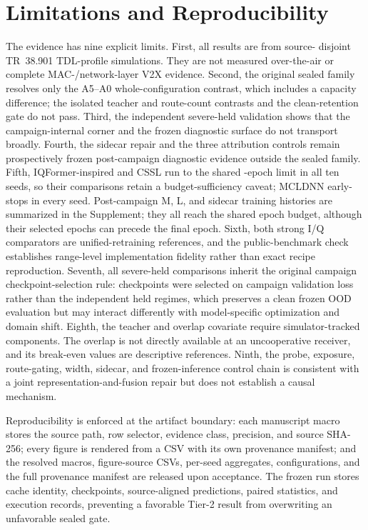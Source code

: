 \documentclass[letterpaper,journal]{IEEEtran}
\begin{document}
\section{Limitations and Reproducibility}
The evidence has nine explicit limits. First, all results are from source-
disjoint TR~38.901 TDL-profile simulations. They are not measured over-the-air
or complete MAC-/network-layer V2X evidence. Second, the original sealed family
resolves only the A5--A0 whole-configuration contrast, which includes a
capacity difference; the isolated teacher and route-count contrasts and the
clean-retention gate do not pass. Third, the
independent severe-held validation shows that the campaign-internal corner and
the frozen diagnostic surface do not transport broadly. Fourth, the sidecar
repair and the three attribution controls remain prospectively frozen post-campaign
diagnostic evidence outside the sealed family. Fifth, IQFormer-inspired and
CSSL run to the shared \TrainEpochs-epoch limit in all ten seeds, so their
comparisons retain a budget-sufficiency caveat; MCLDNN early-stops in every
seed. Post-campaign M, L, and sidecar training histories are summarized in the
Supplement; they all reach the shared epoch budget, although their selected
epochs can precede the final epoch. Sixth, both strong
I/Q comparators are unified-retraining references, and the public-benchmark
check establishes range-level implementation fidelity rather than exact recipe
reproduction. Seventh, all severe-held comparisons inherit the original
campaign checkpoint-selection rule: checkpoints were selected on campaign
validation loss rather than the independent held regimes, which preserves a
clean frozen OOD evaluation but may interact differently with model-specific
optimization and domain shift. Eighth, the teacher and overlap covariate
require simulator-tracked components. The overlap is not directly available at
an uncooperative receiver, and its break-even values are descriptive
references. Ninth, the probe, exposure, route-gating, width, sidecar, and
frozen-inference control chain is consistent with a joint
representation-and-fusion repair but does not establish a causal mechanism.

Reproducibility is enforced at the artifact boundary: each manuscript macro
stores the source path, row selector, evidence class, precision, and source
SHA-256; every figure is rendered from a CSV with its own provenance
manifest; and the resolved macros, figure-source CSVs, per-seed aggregates,
configurations, and the full provenance manifest are released upon
acceptance. The frozen run stores cache identity, checkpoints,
source-aligned predictions, paired statistics, and execution records,
preventing a favorable Tier-2 result from overwriting an unfavorable sealed
gate.
\end{document}
